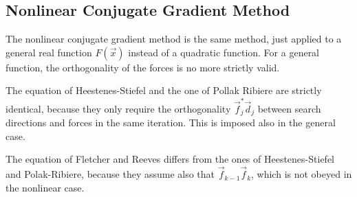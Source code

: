 \documentclass[11pt,a4paper]{report}
\begin{document}
\subsection{Nonlinear Conjugate Gradient Method}
The nonlinear conjugate gradient method is the same method, just
applied to a general real function $F(\vec{x})$ instead of a quadratic
function.
For a general function, the orthogonality of the forces is no more
strictly valid. 

The equation of Heestenes-Stiefel and the one of Pollak Ribiere are
strictly identical, because they only require the orthogonality
$\vec{f}_j^*\vec{d}_j$ between search directions and forces in the
same iteration. This is imposed also in the general case.

The equation of Fletcher and Reeves differs from the ones of
Heestenes-Stiefel and Polak-Ribiere, because they assume also that
$\vec{f}_{k-1}\vec{f}_k$, which is not obeyed in the nonlinear case.




\end{document}
